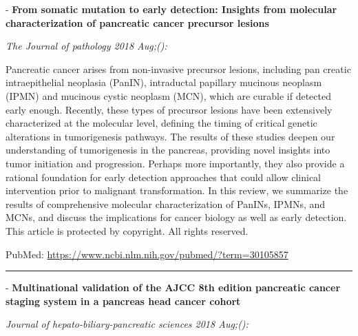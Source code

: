 \documentclass[]{article}
\begin{document}
 - \textbf{From somatic mutation to early detection: Insights from
molecular characterization of pancreatic cancer precursor lesions}

\emph{The Journal of pathology 2018 Aug;():}

Pancreatic cancer arises from non-invasive precursor lesions, including
pan creatic intraepithelial neoplasia (PanIN), intraductal papillary
mucinous neoplasm (IPMN) and mucinous cystic neoplasm (MCN), which are
curable if detected early enough. Recently, these types of precursor
lesions have been extensively characterized at the molecular level,
defining the timing of critical genetic alterations in tumorigenesis
pathways. The results of these studies deepen our understanding of
tumorigenesis in the pancreas, providing novel insights into tumor
initiation and progression. Perhaps more importantly, they also provide
a rational foundation for early detection approaches that could allow
clinical intervention prior to malignant transformation. In this review,
we summarize the results of comprehensive molecular characterization of
PanINs, IPMNs, and MCNs, and discuss the implications for cancer biology
as well as early detection. This article is protected by copyright. All
rights reserved.

PubMed: \url{https://www.ncbi.nlm.nih.gov/pubmed/?term=30105857}

{}

{}

\begin{center}\rule{0.5\linewidth}{\linethickness}\end{center}

 - \textbf{Multinational validation of the AJCC 8th edition pancreatic
cancer staging system in a pancreas head cancer cohort}

\emph{Journal of hepato-biliary-pancreatic sciences 2018 Aug;():}
\end{document}
